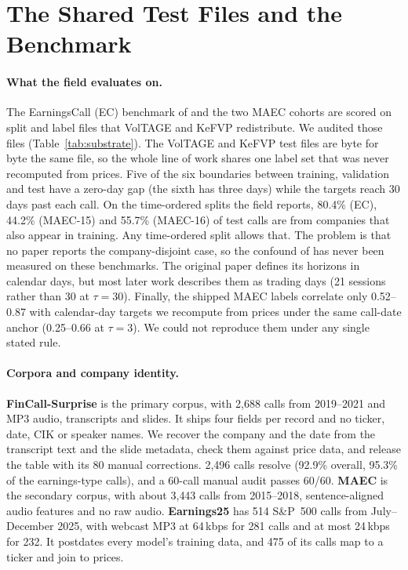 \section{The Shared Test Files and the Benchmark}
\label{sec:benchmark}

\paragraph{What the field evaluates on.}
\label{sec:substrate}
The EarningsCall (EC) benchmark of \citet{qin2019what} and the two MAEC cohorts
are scored on split and label files that VolTAGE and KeFVP redistribute. We
audited those files (Table~\ref{tab:substrate}). The VolTAGE and KeFVP test files
are byte for byte the same file, so the whole line of work shares one label set
that was never recomputed from prices. Five of the six boundaries between
training, validation and test have a zero-day gap (the sixth has three days)
while the targets reach 30 days past each call. On the time-ordered splits the field reports, 80.4\% (EC), 44.2\% (MAEC-15)
and 55.7\% (MAEC-16) of test calls are from companies that also appear in
training. Any time-ordered split allows that. The problem is that no paper reports
the company-disjoint case, so the confound of \citet{scss2024} has never been
measured on these benchmarks. The original paper defines its horizons in calendar
days, but most later work describes them as trading days (21 sessions rather than
30 at $\tau{=}30$). Finally, the shipped MAEC labels correlate only 0.52--0.87 with
calendar-day targets we recompute from prices under the same call-date anchor
(0.25--0.66 at $\tau{=}3$). We could not reproduce them under any single stated
rule.



\paragraph{Corpora and company identity.}
\textbf{FinCall-Surprise} \citep{fincall2025} is the primary corpus, with 2{,}688
calls from 2019--2021 and MP3 audio, transcripts and slides. It ships four fields
per record and no ticker, date, CIK or speaker names. We recover the company and
the date from the transcript text and the slide metadata, check them against price
data, and release the table with its 80 manual corrections. 2{,}496 calls resolve
(92.9\% overall, 95.3\% of the earnings-type calls), and a 60-call manual audit
passes 60/60. \textbf{MAEC} \citep{li2020maec} is the secondary corpus, with about
3{,}443 calls from 2015--2018, sentence-aligned audio features and no raw audio.
\textbf{Earnings25} \citep{jiang2026earnings25} has 514 S\&P~500 calls from
July--December 2025, with webcast MP3 at 64\,kbps for 281 calls and at most
24\,kbps for 232. It postdates every model's training data, and 475 of its calls
map to a ticker and join to prices.

